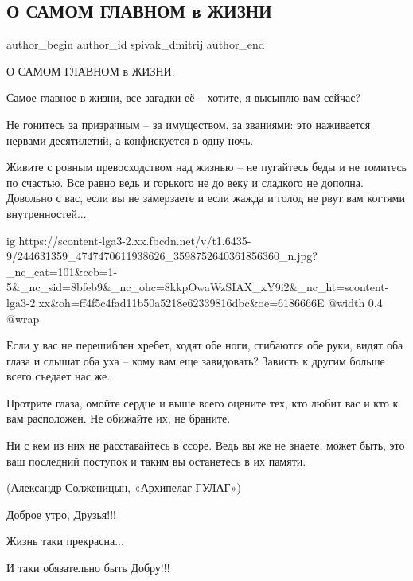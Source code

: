  
 
 
 
 
 
\subsection{О САМОМ ГЛАВНОМ в ЖИЗНИ}
\label{sec:07_10_2021.fb.spivak_dmitrij.1.zhizn_glavnoje}
 
\ifcmt
 author_begin
   author_id spivak_dmitrij
 author_end
\fi

О САМОМ ГЛАВНОМ в ЖИЗНИ.

Самое главное в жизни, все загадки её – хотите, я высыплю вам сейчас?

Не гонитесь за призрачным – за имуществом, за званиями: это наживается нервами
десятилетий, а конфискуется в одну ночь.

Живите с ровным превосходством над жизнью – не пугайтесь беды и не томитесь по
счастью. Все равно ведь и горького не до веку и сладкого не дополна. Довольно с
вас, если вы не замерзаете и если жажда и голод не рвут вам когтями
внутренностей... 

\ifcmt
  ig https://scontent-lga3-2.xx.fbcdn.net/v/t1.6435-9/244631359_4747470611938626_3598752640361856360_n.jpg?_nc_cat=101&ccb=1-5&_nc_sid=8bfeb9&_nc_ohc=8kkpOwaWzSIAX_xY9i2&_nc_ht=scontent-lga3-2.xx&oh=ff4f5c4fad11b50a5218e62339816dbc&oe=6186666E
  @width 0.4
  @wrap 
\fi

Если у вас не перешиблен хребет, ходят обе ноги, сгибаются обе руки, видят оба
глаза и слышат оба уха – кому вам еще завидовать? Зависть к другим больше всего
съедает нас же.

Протрите глаза, омойте сердце и выше всего оцените тех, кто любит вас и кто к
вам расположен. Не обижайте их, не браните.

Ни с кем из них не расставайтесь в ссоре. Ведь вы же не знаете, может быть, это
ваш последний поступок и таким вы останетесь в их памяти.

(Александр Солженицын, «Архипелаг ГУЛАГ»)

Доброе утро, Друзья!!! 

Жизнь таки прекрасна...

И таки обязательно быть Добру!!!
